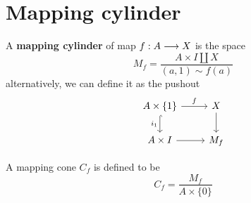 \documentclass[11pt]{book} %
\begin{document}
\section{Mapping cylinder}
\begin{definition}
A \textbf{mapping cylinder} of map $f: A\longrightarrow X$ is  the space
$$
M_f=\frac{A\times I\coprod X}{(a,1)\sim f(a)}
$$
alternatively, we can define it as  the pushout
$$
\begin{tikzcd}
A\times\{1\} \arrow[r, "f"] \arrow[d, "i_1"', hook] & X \arrow[d] \\
A\times I \arrow[r] & M_f
\end{tikzcd}
$$

A mapping cone $C_f$ is defined to be
$$
C_f=\frac{M_f}{A\times \{0\}}
$$
\end{definition}
\end{document}

